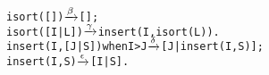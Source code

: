 \begin{alltt}
isort(   [])               \(\smashedrightarrow{\beta}\) [];
isort([I|L])               \(\smashedrightarrow{\gamma}\) insert(I,isort(L)).
insert(I,[J|S]) when I > J \(\smashedrightarrow{\delta}\) [J|insert(I,S)];
insert(I,    S)            \(\smashedrightarrow{\epsilon}\) [I|S].
\end{alltt}
